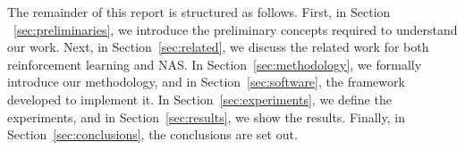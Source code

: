 The remainder of this report is structured as follows. First, in  Section ~\ref{sec:preliminaries}, we introduce the preliminary concepts required to understand our work. Next, in Section~\ref{sec:related}, we discuss the related work for both reinforcement learning and NAS. In Section~\ref{sec:methodology}, we formally introduce our methodology, and in Section~\ref{sec:software}, the framework developed to implement it. In Section~\ref{sec:experiments}, we define the experiments, and in Section~\ref{sec:results}, we show the results. Finally, in Section~\ref{sec:conclusions}, the conclusions are set out.